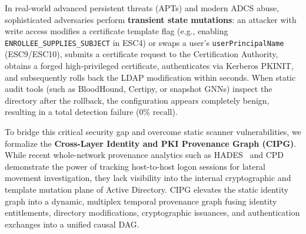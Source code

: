In real-world advanced persistent threats (APTs) and modern ADCS abuse, sophisticated adversaries perform \textbf{transient state mutations}: an attacker with write access modifies a certificate template flag (e.g., enabling \texttt{ENROLLEE\_SUPPLIES\_SUBJECT} in ESC4) or swaps a user's \texttt{userPrincipalName} (ESC9/ESC10), submits a certificate request to the Certification Authority, obtains a forged high-privileged certificate, authenticates via Kerberos PKINIT, and subsequently rolls back the LDAP modification within seconds. When static audit tools (such as BloodHound, Certipy, or snapshot GNNs) inspect the directory after the rollback, the configuration appears completely benign, resulting in a total detection failure ($0\%$ recall).

To bridge this critical security gap and overcome static scanner vulnerabilities, we formalize the \textbf{Cross-Layer Identity and PKI Provenance Graph (CIPG)}. While recent whole-network provenance analytics such as HADES~\cite{liu2026hades} and CPD~\cite{liu2026cpd} demonstrate the power of tracking host-to-host logon sessions for lateral movement investigation, they lack visibility into the internal cryptographic and template mutation plane of Active Directory. CIPG elevates the static identity graph into a dynamic, multiplex temporal provenance graph fusing identity entitlements, directory modifications, cryptographic issuances, and authentication exchanges into a unified causal DAG.

